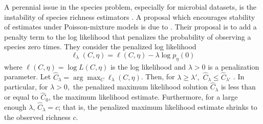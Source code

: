 \documentclass[12pt]{article}
\theoremstyle{break}
\theoremstyle{break}
\begin{document}
A perennial issue in the species problem, especially for microbial datasets, is the instability of species richness estimators \citep{Rocchetti:2011tv,willis_2015}.
%
%
%
A proposal which encourages stability of estimates under Poisson-mixture models is due to \citet{wang_2005}.  Their proposal is to add a penalty term to the log likelihood that penalizes the probability of observing a species zero times. They consider the
penalized log likelihood
\begin{equation}
\ell_\lambda(C, \eta) = \ell(C,\eta) - \lambda \log p_{\eta}(0)
\label{eq:wang_lindsay}
\end{equation}
where $\ell(C,\eta) = \log L(C, \eta)$ is the log likelihood and $\lambda > 0$ is a penalization parameter.
Let $\hat{C}_\lambda = \arg \max_{C} \ell_\lambda(C, \eta)$.
Then, for $\lambda \geq \lambda',$ $\hat{C}_\lambda \leq \hat{C}_{\lambda'}$ \citep[Theorem 1]{wang_2005}. In particular, for $\lambda > 0,$ the penalized maximum likelihood solution $\hat{C}_\lambda$ is less than or equal to $\hat{C}_0$, the maximum likelihood estimate. Furthermore, for a large enough $\lambda$, $\hat{C}_\lambda = c$; that is, the penalized maximum likelihood estimate shrinks to the observed richness $c$.
\end{document}

